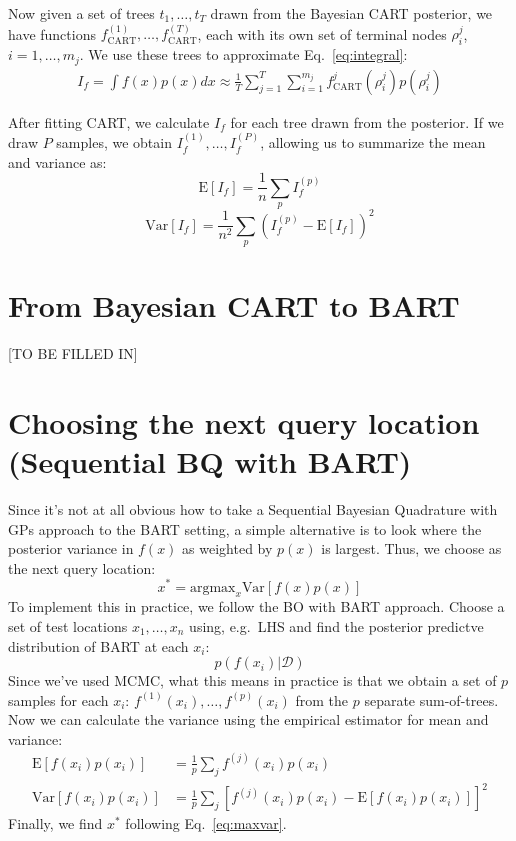 \documentclass[12pt]{article}
\begin{document}
Now given a set of trees $t_1, \ldots, t_T$ drawn from the Bayesian CART posterior, we have
functions $f_{\mbox{CART}}^{(1)}, \ldots, f_{\mbox{CART}}^{(T)}$, each with its own set of terminal
nodes $\rho_i^{j}$, $i=1, \ldots, m_j$. We use these trees to approximate
Eq.~\eqref{eq:integral}:
\begin{align}
	I_f = \int f(x)p(x) dx \approx \frac{1}{T} \sum_{j=1}^T \sum_{i=1}^{m_j} f_{\mbox{CART}}^j(\rho_i^j) p(\rho_i^j)
\end{align}

After fitting CART, we calculate $I_f$ for each tree drawn from the posterior.
If we draw $P$ samples, we obtain $I_f^{(1)}, \ldots, I_f^{(P)}$, allowing us to summarize
the mean and variance as:
\begin{equation}
	\mbox{E}[I_f] = \frac{1}{n} \sum_p I_f^{(p)}
\end{equation}
\begin{equation}
	\mbox{Var}[I_f] = \frac{1}{n^2} \sum_p (I_f^{(p)} - \mbox{E}[I_f])^2
\end{equation}

\section{From Bayesian CART to BART}
[TO BE FILLED IN]

\section{Choosing the next query location (Sequential BQ with BART)}
Since it's not at all obvious how to take a Sequential Bayesian Quadrature with GPs approach to the BART setting,
a simple alternative is to look where the posterior variance in $f(x)$ as weighted by $p(x)$ is largest.
Thus, we choose as the next query location:
\begin{equation}
	x^* = \mbox{argmax}_{x} \mbox{Var}[f(x)p(x)]
	\label{eq:maxvar}
\end{equation}
To implement this in practice, we follow the BO with BART approach. Choose a set of test locations $x_1, \ldots, x_n$
using, e.g.~LHS and find the posterior predictve distribution of BART at each $x_i$:
\begin{equation}
	p(f(x_i) | \mathcal{D})
\end{equation}
Since we've used MCMC, what this means in practice is that we obtain a set of $p$ samples for each $x_i$: $f^{(1)}(x_i), \ldots, f^{(p)}(x_i)$ from the $p$ separate sum-of-trees. 
Now we can calculate the variance using the empirical estimator for mean and variance:
\begin{align}
	\mbox{E}[f(x_i)p(x_i)] &= \frac{1}{p} \sum_j f^{(j)}(x_i)p(x_i) \\
	\mbox{Var}[f(x_i)p(x_i)] &= \frac{1}{p} \sum_j \left[f^{(j)}(x_i)p(x_i) - \mbox{E}[f(x_i)p(x_i)]\right]^2
\end{align}
Finally, we find $x^*$ following Eq.~\eqref{eq:maxvar}.
\end{document}
